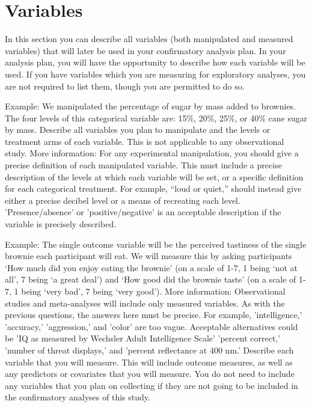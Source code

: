 \documentclass[highlight, explanations]{prereg}
\begin{document}
\section{Variables}

In this section you can describe all variables (both manipulated and measured variables) that will later be used in your confirmatory analysis plan. In your analysis plan, you will have the opportunity to describe how each variable will be used. If you have variables which you are measuring for exploratory analyses, you are not required to list them, though you are permitted to do so.


{Example: We manipulated the percentage of sugar by mass added to brownies. The four levels of this categorical variable are: 15\%, 20\%, 25\%, or 40\% cane sugar by mass. 
}
{Describe all variables you plan to manipulate and the levels or treatment arms of each variable. This is not applicable to any observational study. 
More information: For any experimental manipulation, you should give a precise definition of each manipulated variable. This must include a precise description of the levels at which each variable will be set, or a specific definition for each categorical treatment. For example, “loud or quiet,” should instead give either a precise decibel level or a means of recreating each level. 'Presence/absence' or 'positive/negative' is an acceptable description if the variable is precisely described.
}

{Example: The single outcome variable will be the perceived tastiness of the single brownie each participant will eat. We will measure this by asking participants ‘How much did you enjoy eating the brownie’ (on a scale of 1-7, 1 being ‘not at all’, 7 being ‘a great deal’) and ‘How good did the brownie taste’ (on a scale of 1-7, 1 being ‘very bad’, 7 being ‘very good’). 
More information: Observational studies and meta-analyses will include only measured variables. As with the previous questions, the answers here must be precise. For example, 'intelligence,' 'accuracy,' 'aggression,' and 'color' are too vague. Acceptable alternatives could be 'IQ as measured by Wechsler Adult Intelligence Scale' 'percent correct,' 'number of threat displays,' and 'percent reflectance at 400 nm.'
}
{Describe each variable that you will measure. This will include outcome measures, as well as any predictors or covariates that you will measure. You do not need to include any variables that you plan on collecting if they are not going to be included in the confirmatory analyses of this study.
}
\end{document}
